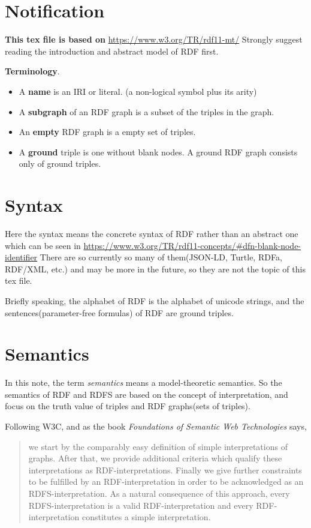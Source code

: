 \documentclass{article}
\begin{document}
\section{Notification}
\textbf{This tex file is based on} \newline
\url{https://www.w3.org/TR/rdf11-mt/}\newline
Strongly suggest reading the introduction and abstract model of RDF first. \newline

 \textbf{Terminology}.
\begin{itemize}
\item A \textbf{name} is an IRI or literal. (a non-logical symbol plus its arity)
\item A \textbf{subgraph} of an RDF graph is a subset of the triples in the graph. 
\item An \textbf{empty} RDF graph is a empty set of triples.
\item A \textbf{ground} triple is one without blank nodes. A ground RDF graph consists only of ground triples.
\end{itemize}

\section{Syntax}
Here the syntax means the concrete syntax of RDF rather than an abstract one which can be seen in \newline
\url{https://www.w3.org/TR/rdf11-concepts/#dfn-blank-node-identifier}
\newline  There are so currently so many of them(JSON-LD, Turtle, RDFa, RDF/XML, etc.) and may be more in the future, so they are not the topic of this tex file.\newline

 Briefly speaking, the alphabet of RDF is the alphabet of unicode strings, and 
the sentences(parameter-free formulas) of RDF are ground triples.


\section{Semantics}

In this note, the term \textit{semantics} means a model-theoretic semantics. So the semantics of RDF and RDFS are based on the concept of interpretation, and focus on the truth value of triples and RDF graphs(sets of triples).

Following W3C, and as the book \textit{Foundations of Semantic Web Technologies} says\cite{book}, \newline
\begin{quotation}
we start by the comparably easy definition of simple interpretations of graphs. After that, we provide additional criteria which qualify these interpretations as RDF-interpretations. Finally we give further constraints to be fulfilled by an RDF-interpretation in order to be acknowledged as an RDFS-interpretation. As a natural consequence of this approach, every RDFS-interpretation is a valid RDF-interpretation and every RDF-interpretation constitutes a simple interpretation.
\end{quotation}
\newpage 
\end{document}
